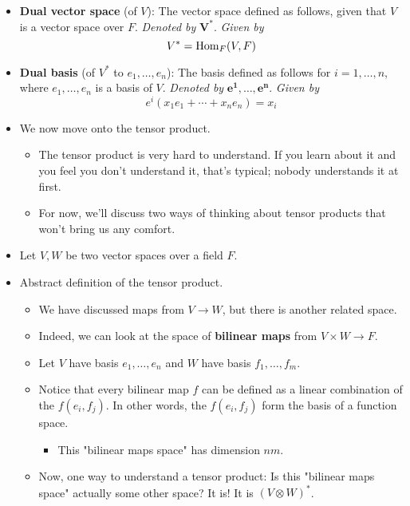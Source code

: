 \documentclass[../notes.tex]{subfiles}
\begin{document}
\begin{itemize}
\begin{itemize}
\begin{itemize}
        \end{itemize}
    \end{itemize}
    \item \textbf{Dual vector space} (of $V$): The vector space defined as follows, given that $V$ is a vector space over $F$. \emph{Denoted by} $\bm{V^*}$. \emph{Given by}
    \begin{equation*}
        V^* = \operatorname{Hom}_F(V,F)
    \end{equation*}
    \item \textbf{Dual basis} (of $V^*$ to $e_1,\dots,e_n$): The basis defined as follows for $i=1,\dots,n$, where $e_1,\dots,e_n$ is a basis of $V$. \emph{Denoted by} $\bm{e^1,\ldots,e^n}$. \emph{Given by}
    \begin{equation*}
        e^i(x_1e_1+\cdots+x_ne_n) = x_i
    \end{equation*}
    \item We now move onto the tensor product.
    \begin{itemize}
        \item The tensor product is very hard to understand. If you learn about it and you feel you don't understand it, that's typical; nobody understands it at first.
        \item For now, we'll discuss two ways of thinking about tensor products that won't bring us any comfort.
    \end{itemize}
    \item Let $V,W$ be two vector spaces over a field $F$.
    \item Abstract definition of the tensor product.
    \begin{itemize}
        \item We have discussed maps from $V\to W$, but there is another related space.
        \item Indeed, we can look at the space of \textbf{bilinear maps} from $V\times W\to F$.
        \item Let $V$ have basis $e_1,\dots,e_n$ and $W$ have basis $f_1,\dots,f_m$.
        \item Notice that every bilinear map $f$ can be defined as a linear combination of the $f(e_i,f_j)$. In other words, the $f(e_i,f_j)$ form the basis of a function space.
        \begin{itemize}
            \item This "bilinear maps space" has dimension $nm$.
        \end{itemize}
        \item Now, one way to understand a tensor product: Is this "bilinear maps space" actually some other space? It is! It is $(V\otimes W)^*$.

\end{itemize}
\end{itemize}
\end{document}
